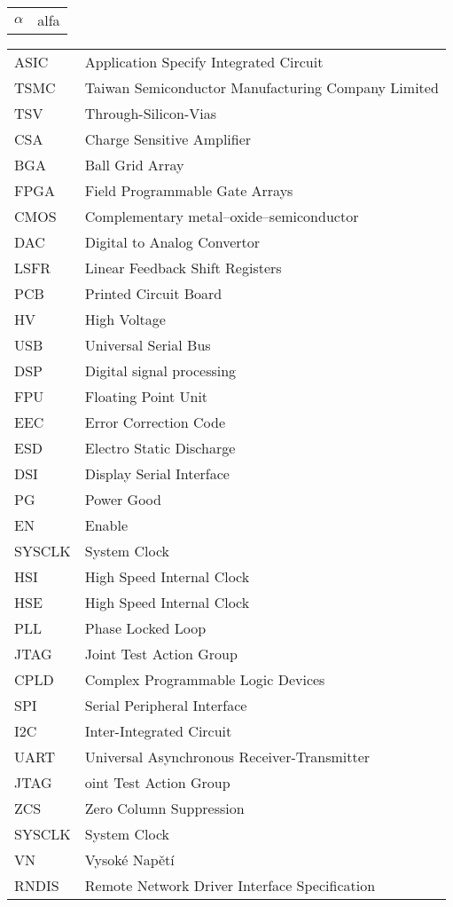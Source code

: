 \begin{tabular}{ l  l }
	
	$\alpha$ 			& alfa 				\\
	
\end{tabular}

\begin{tabular}{ l  l }
	
	ASIC & Application Specify Integrated Circuit \\
	TSMC & Taiwan Semiconductor Manufacturing Company Limited \\ 
	TSV	 & Through-Silicon-Vias \\
	CSA & Charge Sensitive Amplifier \\
	BGA & Ball Grid Array \\
	FPGA & Field Programmable Gate Arrays \\
	CMOS & Complementary metal–oxide–semiconductor \\
	DAC & Digital to Analog Convertor \\
	LSFR & Linear Feedback Shift Registers \\
	PCB & Printed Circuit Board \\
	HV & High Voltage \\
	USB & Universal Serial Bus \\
	DSP & Digital signal processing \\
	FPU & Floating Point Unit \\
	EEC & Error Correction Code \\
	ESD & Electro Static Discharge \\
	DSI & Display Serial Interface \\
	PG & Power Good \\
	EN & Enable \\
	SYSCLK & System Clock \\
	HSI & High Speed Internal Clock \\
	HSE & High Speed Internal Clock \\
	PLL & Phase Locked Loop \\
	JTAG & Joint Test Action Group \\
	CPLD & Complex Programmable Logic Devices \\
	SPI & Serial Peripheral Interface \\
	I2C & Inter-Integrated Circuit \\
	UART & Universal Asynchronous Receiver-Transmitter \\
	JTAG & oint Test Action Group \\
	ZCS & Zero Column Suppression \\
	SYSCLK & System Clock \\
	VN & Vysoké Napětí \\
	RNDIS & Remote Network Driver Interface Specification \\
	
	
		
\end{tabular}